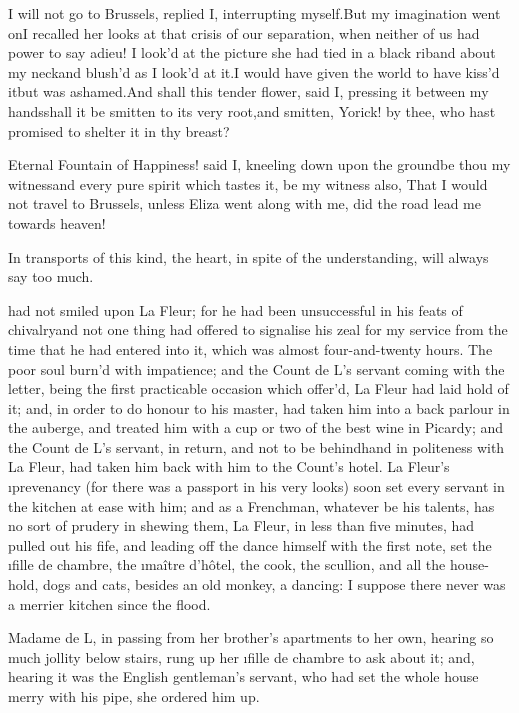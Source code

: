 \documentclass[twoside]{article}
\begin{document}
\tsk I will not go to Brussels, replied I, interrupting myself.\tsk But my
imagination went on\tsk I recalled her looks at that crisis of our
separation, when neither of us had power to say adieu!  I look’d at the
picture she had tied in a black riband about my neck\tsk and blush’d as I
look’d at it.\tsk I would have given the world to have kiss’d it\tsk but was
ashamed.\tsk And shall this tender flower, said I, pressing it between my
hands\tsk shall it be smitten to its very root,\tsk and smitten, Yorick! by
thee, who hast promised to shelter it in thy breast?

Eternal Fountain of Happiness! said I, kneeling down upon the ground\tsk be
thou my witness\tsk and every pure spirit which tastes it, be my witness
also, That I would not travel to Brussels, unless Eliza went along with
me, did the road lead me towards heaven!

In transports of this kind, the heart, in spite of the understanding,
will always say too much.






 had not smiled upon La Fleur; for he had been unsuccessful in his
feats of chivalry\tsk and not one thing had offered to signalise his zeal
for my service from the time that he had entered into it, which was
almost four-and-twenty hours.  The poor soul burn’d with impatience; and
the Count de L\tsk ’s servant coming with the letter, being the first
practicable occasion which offer’d, La Fleur had laid hold of it; and, in
order to do honour to his master, had taken him into a back parlour in
the auberge, and treated him with a cup or two of the best wine in
Picardy; and the Count de L\tsk ’s servant, in return, and not to be
behindhand in politeness with La Fleur, had taken him back with him to
the Count’s hotel.  La Fleur’s \i{prevenancy} (for there was a passport in
his very looks) soon set every servant in the kitchen at ease with him;
and as a Frenchman, whatever be his talents, has no sort of prudery in
shewing them, La Fleur, in less than five minutes, had pulled out his
fife, and leading off the dance himself with the first note, set the
\i{fille de chambre}, the \i{maître d’hôtel}, the cook, the scullion, and all
the house-hold, dogs and cats, besides an old monkey, a dancing: I
suppose there never was a merrier kitchen since the flood.

Madame de L\tsk , in passing from her brother’s apartments to her own,
hearing so much jollity below stairs, rung up her \i{fille de chambre} to
ask about it; and, hearing it was the English gentleman’s servant, who
had set the whole house merry with his pipe, she ordered him up.
\end{document}
